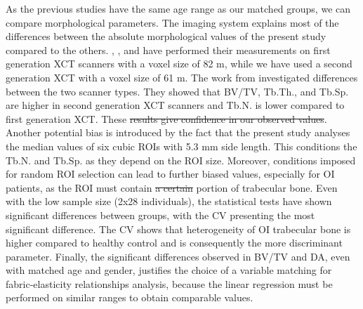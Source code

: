 \documentclass[a4paper,fleqn]{DC_ArtStyle}
\providecommand{\DIFadd}[1]{{\protect\color{blue}{#1}}} %
\providecommand{\DIFdel}[1]{{\protect\color{red}\sout{#1}}}                      %
\providecommand{\DIFaddbegin}{} %
\providecommand{\DIFaddend}{} %
\providecommand{\DIFdelbegin}{} %
\providecommand{\DIFdelend}{} %
\begin{document}
\DIFdelend As the previous studies \cite{Folkestad2012,Kocijan2015,Rolvien2018} have the same age range as our matched groups, we can compare \DIFaddbegin \DIFadd{the }\DIFaddend morphological parameters. The \DIFaddbegin \DIFadd{CT }\DIFaddend imaging system explains most of the differences between the absolute morphological values of the present study compared to the others. \citeauthor{Folkestad2012}\cite{Folkestad2012}, \citeauthor{Kocijan2015}\cite{Kocijan2015}, and \citeauthor{Rolvien2018}\cite{Rolvien2018} have performed their measurements on first generation XCT scanners with a voxel size of 82 \si{\micro}m, while we have used a second generation XCT with a voxel size of 61 \si{\micro}m. The work from \citeauthor{Agarwal2016}\cite{Agarwal2016} investigated differences between the two scanner types. They showed that BV/TV, Tb.Th., and Tb.Sp. are higher in second generation XCT scanners and Tb.N. is lower compared to first generation XCT. These \DIFdelbegin \DIFdel{results give confidence in our observed values}\DIFdelend \DIFaddbegin \DIFadd{findings are in full agreement with our observations}\DIFaddend . Another potential bias is introduced by the fact that the present study analyses the median values of six cubic ROIs with 5.3 mm side length. This conditions the Tb.N. and Tb.Sp. as they depend on the ROI size. Moreover, conditions imposed for random ROI selection can lead to further biased values, especially for OI patients, as the ROI must contain \DIFdelbegin \DIFdel{a certain }\DIFdelend \DIFaddbegin \DIFadd{at least some }\DIFaddend portion of trabecular bone. Even with the low sample size (2x28 individuals), the statistical tests have shown significant differences between groups, with the CV presenting the most significant difference. The CV shows that heterogeneity of OI trabecular bone is higher compared to healthy control and is consequently the more discriminant parameter. Finally, the significant differences observed in BV/TV and DA, even with matched age and gender, justifies the choice of a variable matching for fabric-elasticity relationships analysis, because the linear regression must be performed on similar ranges to obtain comparable values. \\
\DIFdelbegin %
\end{document}
